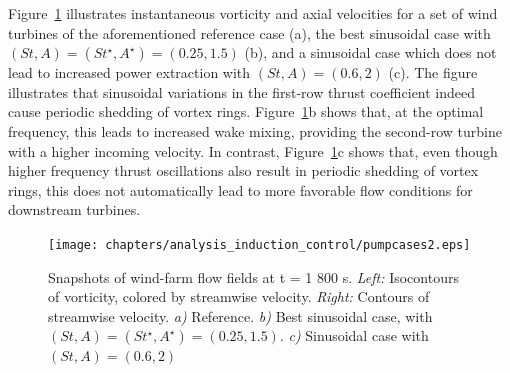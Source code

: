 Figure~\ref{fig:vorticity_parametersweep} illustrates instantaneous vorticity and axial velocities for a set of wind turbines of the aforementioned reference case (a), the best sinusoidal case with $(St, A) = (St^\star, A^\star)= (0.25, 1.5)$ (b), and a sinusoidal case which does not lead to increased power extraction with $(St, A) = (0.6, 2)$ (c). The figure illustrates that sinusoidal variations in the first-row thrust coefficient indeed cause periodic shedding of vortex rings. Figure~\ref{fig:vorticity_parametersweep}b shows that, at the optimal frequency, this leads to increased wake mixing, providing the second-row turbine with a higher incoming velocity. In contrast, Figure~\ref{fig:vorticity_parametersweep}c shows that, even though higher frequency thrust oscillations also result in periodic shedding of vortex rings, this does not automatically lead to more favorable flow conditions for downstream turbines. 
\begin{figure}
	\centering
	\texttt{[image: chapters/analysis\_induction\_control/pumpcases2.eps]}
	\caption[Snapshots of wind-farm flow fields at t = 1 800 s.]{Snapshots of wind-farm flow fields at t = 1 800 s. \emph{Left: } Isocontours of vorticity, colored by streamwise velocity. \emph{Right: } Contours of streamwise velocity. \emph{a)} Reference. \emph{b)} Best sinusoidal case, with $(St , A) = (St^\star, A^\star) = (0.25, 1.5)$. \emph{c)} Sinusoidal case with $(St, A) = (0.6, 2)$ \label{fig:vorticity_parametersweep}  }
\end{figure}

